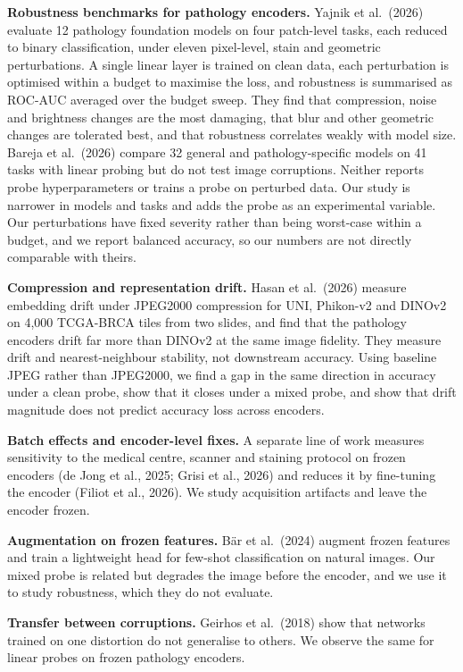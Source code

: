 \documentclass[11pt,a4paper]{article}
\begin{document}
\textbf{Robustness benchmarks for pathology encoders.} Yajnik et al.\ (2026) evaluate 12 pathology foundation models on four patch-level tasks, each reduced to binary classification, under eleven pixel-level, stain and geometric perturbations. A single linear layer is trained on clean data, each perturbation is optimised within a budget to maximise the loss, and robustness is summarised as ROC-AUC averaged over the budget sweep. They find that compression, noise and brightness changes are the most damaging, that blur and other geometric changes are tolerated best, and that robustness correlates weakly with model size. Bareja et al.\ (2026) compare 32 general and pathology-specific models on 41 tasks with linear probing but do not test image corruptions. Neither reports probe hyperparameters or trains a probe on perturbed data. Our study is narrower in models and tasks and adds the probe as an experimental variable. Our perturbations have fixed severity rather than being worst-case within a budget, and we report balanced accuracy, so our numbers are not directly comparable with theirs.

\textbf{Compression and representation drift.} Hasan et al.\ (2026) measure embedding drift under JPEG2000 compression for UNI, Phikon-v2 and DINOv2 on 4,000 TCGA-BRCA tiles from two slides, and find that the pathology encoders drift far more than DINOv2 at the same image fidelity. They measure drift and nearest-neighbour stability, not downstream accuracy. Using baseline JPEG rather than JPEG2000, we find a gap in the same direction in accuracy under a clean probe, show that it closes under a mixed probe, and show that drift magnitude does not predict accuracy loss across encoders.

\textbf{Batch effects and encoder-level fixes.} A separate line of work measures sensitivity to the medical centre, scanner and staining protocol on frozen encoders (de Jong et al., 2025; Grisi et al., 2026) and reduces it by fine-tuning the encoder (Filiot et al., 2026). We study acquisition artifacts and leave the encoder frozen.

\textbf{Augmentation on frozen features.} B\"ar et al.\ (2024) augment frozen features and train a lightweight head for few-shot classification on natural images. Our mixed probe is related but degrades the image before the encoder, and we use it to study robustness, which they do not evaluate.

\textbf{Transfer between corruptions.} Geirhos et al.\ (2018) show that networks trained on one distortion do not generalise to others. We observe the same for linear probes on frozen pathology encoders.
\end{document}
